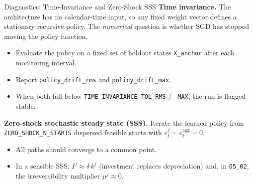 \documentclass[aspectratio=169,11pt]{beamer}
\newcommand{\emphc}[1]{\textcolor{harvardcrimson}{#1}}
\begin{document}
\begin{frame}{Diagnostics: Time-Invariance and Zero-Shock SSS}
\textbf{Time invariance.}  The architecture has no calendar-time input, so any fixed weight vector defines a stationary recursive policy.  The \emph{numerical} question is whether SGD has stopped moving the policy function.

\vspace{0.2em}
\begin{itemize}
    \item Evaluate the policy on a fixed set of holdout states \texttt{X\_anchor} after each monitoring interval.
    \item Report \texttt{policy\_drift\_rms} and \texttt{policy\_drift\_max}.
    \item When both fall below \texttt{TIME\_INVARIANCE\_TOL\_RMS} / \texttt{\_MAX}, the run is flagged \emphc{stable}.
\end{itemize}

\vspace{0.3em}
\textbf{Zero-shock stochastic steady state (SSS).}  Iterate the learned policy from \texttt{ZERO\_SHOCK\_N\_STARTS} dispersed feasible starts with $\varepsilon^j_t = \varepsilon^{\mathrm{agg}}_t = 0$.

\vspace{0.2em}
\begin{itemize}
    \item All paths should converge to a common point.
    \item In a sensible SSS: $I^j \approx \delta\,k^j$ (investment replaces depreciation) and, in \texttt{05\_02}, the irreversibility multiplier $\mu^j \approx 0$.
\end{itemize}
\end{frame}
\end{document}
